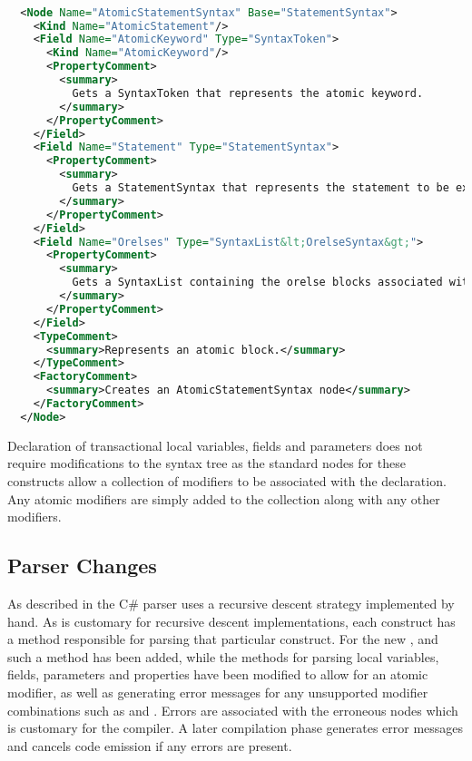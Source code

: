 \begin{lstlisting}[label=lst:roslyn_extension_tre_xml,
  caption={AtomicStatement \ac{XML} definition},
  language=XML,  
  showspaces=false,
  showtabs=false,
  breaklines=true,
  showstringspaces=false,
  breakatwhitespace=true,
  escapechar=~,
  morekeywords={Name, Base, Type}]  % Start your code-block

  <Node Name="AtomicStatementSyntax" Base="StatementSyntax">
    <Kind Name="AtomicStatement"/>
    <Field Name="AtomicKeyword" Type="SyntaxToken">
      <Kind Name="AtomicKeyword"/>
      <PropertyComment>
        <summary>
          Gets a SyntaxToken that represents the atomic keyword.
        </summary>
      </PropertyComment>
    </Field>
    <Field Name="Statement" Type="StatementSyntax">
      <PropertyComment>
        <summary>
          Gets a StatementSyntax that represents the statement to be executed when the condition is true.
        </summary>
      </PropertyComment>
    </Field>
    <Field Name="Orelses" Type="SyntaxList&lt;OrelseSyntax&gt;">
      <PropertyComment>
        <summary>
          Gets a SyntaxList containing the orelse blocks associated with the atomic statement.
        </summary>
      </PropertyComment>
    </Field>
    <TypeComment>
      <summary>Represents an atomic block.</summary>
    </TypeComment>
    <FactoryComment>
      <summary>Creates an AtomicStatementSyntax node</summary>
    </FactoryComment>
  </Node>
\end{lstlisting}

Declaration of transactional local variables, fields and parameters does not require modifications to the syntax tree as the standard nodes for these constructs allow a collection of modifiers to be associated with the declaration. Any atomic modifiers are simply added to the collection along with any other modifiers. 

\subsection{Parser Changes}
As described in  the C\# parser uses a recursive descent strategy implemented by hand. As is customary for recursive descent implementations, each construct has a method responsible for parsing that particular construct. For the new ,  and  such a method has been added, while the methods for parsing local variables, fields, parameters and properties have been modified to allow for an atomic modifier, as well as generating error messages for any unsupported modifier combinations such as  and . Errors are associated with the erroneous nodes which is customary for the compiler. A later compilation phase generates error messages and cancels code emission if any errors are present.

